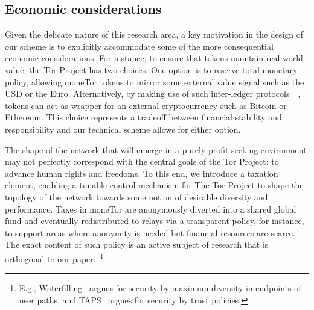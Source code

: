 
\subsection{Economic considerations}



Given the delicate nature of this research area, a key motivation in
the design of our scheme is to explicitly accommodate some of the more
consequential economic considerations. For instance, to ensure that
tokens maintain real-world value, the Tor Project has two 
choices. One option is to reserve total monetary policy, allowing
moneTor tokens to mirror some external value signal such as the USD or
the Euro. Alternatively, by making use of such inter-ledger protocols~\cite{back2014enabling}~\cite{poon2017plasma}, tokens can act
as wrapper for an external cryptocurrency such as Bitcoin or
Ethereum. This choice represents a tradeoff between financial
stability and responsibility and our technical scheme allows for
either option.

The shape of the network that will emerge in a purely profit-seeking
environment may not perfectly correspond with the central goals of the
Tor Project: to advance human rights and freedoms. To this end, we
introduce a taxation element, enabling a tunable control mechanism
for The Tor Project to shape the topology of the network towards some
notion of desirable diversity and performance. Taxes in moneTor are
anonymously diverted into a shared global fund and eventually
redistributed to relays via a transparent policy, for instance, to
support areas where anonymity is needed but financial resources are
scarce. The exact content of such policy is an active subject of
research that is orthogonal to our paper.~\footnote{E.g.,
  Waterfilling~\cite{waterfilling-pets2017} argues for security by
  maximum diversity in endpoints of user paths, and
  TAPS~\cite{taps-ndss2017} argues for security by trust policies.}

